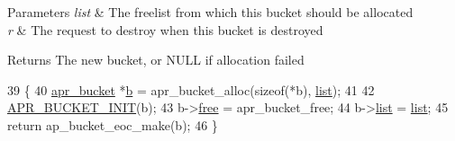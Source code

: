 \begin{DoxyParams}{Parameters}
{\em list} & The freelist from which this bucket should be allocated \\
\hline
{\em r} & The request to destroy when this bucket is destroyed \\
\hline
\end{DoxyParams}
\begin{DoxyReturn}{Returns}
The new bucket, or N\+U\+LL if allocation failed 
\end{DoxyReturn}

\begin{DoxyCode}
39 \{
40     \hyperlink{structapr__bucket}{apr\_bucket} *\hyperlink{group__APACHE__CORE__PROTO_ga7fa09c5c80a7d25b74511944f5949e31}{b} = apr\_bucket\_alloc(\textcolor{keyword}{sizeof}(*b), \hyperlink{group__APACHE__CORE__PROTO_gaeb6b944e4524f915483b5696b7f2f424}{list});
41 
42     \hyperlink{group__APR__Util__Bucket__Brigades_ga00c2e104125f124c3a52627863432de9}{APR\_BUCKET\_INIT}(b);
43     b->\hyperlink{structapr__bucket_a0949c5d398756496e69449c2633975f1}{free} = apr\_bucket\_free;
44     b->\hyperlink{structapr__bucket_a5a500b80105834621514d6c0814d0966}{list} = \hyperlink{group__APACHE__CORE__PROTO_gaeb6b944e4524f915483b5696b7f2f424}{list};
45     \textcolor{keywordflow}{return} ap\_bucket\_eoc\_make(b);
46 \}
\end{DoxyCode}
